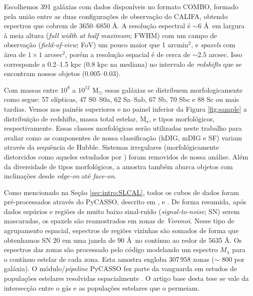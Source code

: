 Escolhemos 391 galáxias com dados disponíveis no formato COMBO, formado pela união entre as duas configurações de observação do CALIFA, obtendo espectros que cobrem de 3650--6850 \AA. A resolução espectral é $\sim 6$ \AA\ em largura à meia altura ({\em full width at half maximum}; FWHM) com um campo de observação ({\em field-of-view}; FoV) um pouco maior que 1 arcmin${}^2$, e {\em spaxels} com área de $1 \times 1$ arcsec$^2$, porém a resolução espacial é de cerca de $\sim 2.5$ arcsec. Isso corresponde a 0.2--1.5 kpc (0.8 kpc na mediana) no intervalo de {\em redshifts} que se encontram nossos objetos (0.005--0.03).

Com massas entre $10^8$ a $10^{12}$ M$_\odot$ essas galáxias se distribuem morfologicamente como segue: 57 elípticas, 47 S0--S0a, 62 Sa--Sab, 67 Sb, 70 Sbc e 88 Sc ou mais tardias. Vemos nos painéis superiores e no painel inferior da Figura \ref{fig:sample} a distribuição de {\rm redshifts}, massa total estelar, M$_\star$, e tipos morfológicos, respectivamente. Essas classes morfológicas serão utilizadas neste trabalho para avaliar como as componentes de nossa classificação (hDIG, mDIG e SF) variam através da sequência de Hubble. Sistemas irregulares (morfológicamente distorcidos como aqueles estudados por \citealt{Wild.etal.2014, BB.etal.2015b, BB.etal.2015a, CortijoFerrero.etal.2017a, CortijoFerrero.etal.2017b}) foram removidos de nossa análise. Além da diversidade de tipos morfológicos, a amostra também abarca objetos com inclinações desde {\em edge-on} até {\em face-on}.

Como mencionado na Seção \ref{sec:intro:SLCAL}, todos os cubos de dados foram pré-processados através do PyCASSO, descrito em \citet{CidFernandes.etal.2013a}, \citet{CidFernandes.etal.2014a} e \citet{deAmorim.etal.2017}. De forma resumida, após dados espúrios e regiões de muito baixo sinal-ruído ({\em signal-to-noise}; SN) serem mascaradas, os spaxels são reamostrados em zonas de {\em Voronoi}. Nesse tipo de agrupamento espacial, espectros de regiões vizinhas são somados de forma que obtenhamos SN 20 em uma janela de 90 \AA\ no contínuo ao redor de 5635 \AA. Os espectros das zonas são processado pelo código \starlight \citep{CidFernandes.etal.2005a} modelando um espectro $M_\lambda$ para o contínuo estelar de cada zona. Esta amostra engloba $307\,958$ zonas ($\sim$ 800 por galáxia). O módulo/{\em pipeline} PyCASSO fez parte da vanguarda em estudos de populações estelares resolvidas espacialmente \citep{Perez.etal.2013, GonzalezDelgado.etal.2014b, GonzalezDelgado.etal.2015a, GonzalezDelgado.etal.2016a, GonzalezDelgado.etal.2017}. O artigo base desta tese se vale da intersecção entre o gás e as populações estelares que o permeiam.

